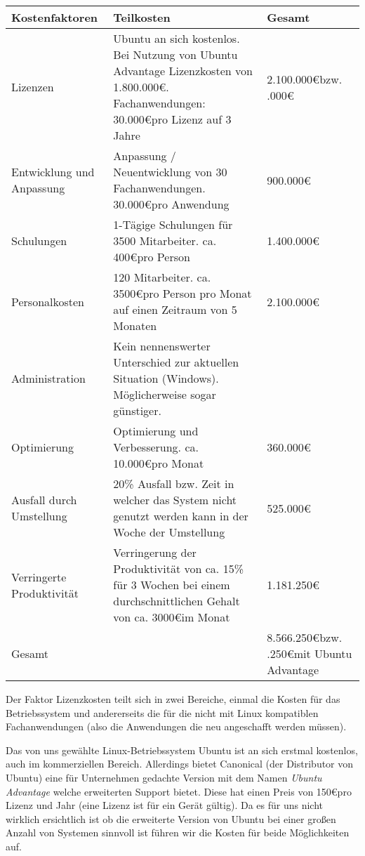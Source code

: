 \documentclass[12pt,utf8]{scrartcl}
\begin{document}
\begin{table}[h]
\begin{tabular}{|p{5cm}|p{8cm}|p{2cm}|}
\hline
Kostenfaktoren & Teilkosten & Gesamt \\
\hline
Lizenzen & Ubuntu an sich kostenlos. Bei Nutzung von Ubuntu Advantage Lizenzkosten von 1.800.000\euro . \newline 70 Fachanwendungen: 30.000\euro \space pro Lizenz auf 3 Jahre & 2.100.000\euro \newline bzw. \newline 3.900.000\euro \\
\hline
Entwicklung und Anpassung & Anpassung / Neuentwicklung von 30 Fachanwendungen. 30.000\euro \space pro Anwendung & 900.000\euro \\
\hline
Schulungen & 1-Tägige Schulungen für 3500 Mitarbeiter. ca. 400\euro \space pro Person & 1.400.000\euro \\
\hline
Personalkosten & 120 Mitarbeiter. ca. 3500\euro \space pro Person pro Monat auf einen Zeitraum von 5 Monaten & 2.100.000\euro \\
\hline
Administration & Kein nennenswerter Unterschied zur aktuellen Situation (Windows). Möglicherweise sogar günstiger. & \\
\hline
Optimierung & Optimierung und Verbesserung. ca. 10.000\euro pro Monat & 360.000\euro \\
\hline
Ausfall durch Umstellung & 20\% Ausfall bzw. Zeit in welcher das System nicht genutzt werden kann in der Woche der Umstellung & 525.000\euro \\
\hline
Verringerte Produktivität & Verringerung der Produktivität von ca. 15\% für 3 Wochen bei einem durchschnittlichen Gehalt von ca. 3000\euro \space im Monat & 1.181.250\euro \\
\hline
Gesamt & & 8.566.250\euro \newline bzw. \newline 10.366.250\euro \space mit Ubuntu Advantage \\
\hline
\end{tabular}
\end{table}

Der Faktor Lizenzkosten teilt sich in zwei Bereiche, einmal die Kosten für das Betriebssystem und andererseits die für die nicht mit Linux kompatiblen Fachanwendungen (also die Anwendungen die neu angeschafft werden müssen).

Das von uns gewählte Linux-Betriebssystem Ubuntu ist an sich erstmal kostenlos, auch im kommerziellen Bereich. Allerdings bietet Canonical (der Distributor von Ubuntu) eine für Unternehmen gedachte Version mit dem Namen \emph{Ubuntu Advantage} welche erweiterten Support bietet. Diese hat einen Preis von 150\euro \space pro Lizenz und Jahr (eine Lizenz ist für ein Gerät gültig). Da es für uns nicht wirklich ersichtlich ist ob die erweiterte Version von Ubuntu bei einer großen Anzahl von Systemen sinnvoll ist führen wir die Kosten für beide Möglichkeiten auf.
\end{document}
